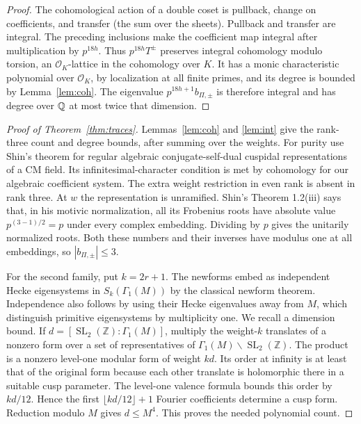 \documentclass[a4paper,11pt]{article}
\theoremstyle{definition}
\theoremstyle{remark}
\newcommand{\ZZ}{\mathbb Z}\newcommand{\ord}{\operatorname{ord}}
\numberwithin{equation}{section}
\newcommand{\OO}{\mathcal O}
\begin{document}
\begin{proof}
The cohomological action of a double coset is pullback, change on coefficients, and transfer (the sum over the sheets). Pullback and transfer are integral. The preceding inclusions make the coefficient map integral after multiplication by \(p^{18h}\). Thus \(p^{18h}T^\pm\) preserves integral cohomology modulo torsion, an \(\OO_K\)-lattice in the cohomology over \(K\). It has a monic characteristic polynomial over \(\OO_K\), by localization at all finite primes, and its degree is bounded by Lemma~\ref{lem:coh}. The eigenvalue \(p^{18h+1}b_{\Pi,\pm}\) is therefore integral and has degree over \(\mathbb Q\) at most twice that dimension.
\end{proof}

\begin{proof}[Proof of Theorem~\ref{thm:traces}]
Lemmas~\ref{lem:coh} and \ref{lem:int} give the rank-three count and degree bounds, after summing over the weights. For purity use Shin's theorem for regular algebraic conjugate-self-dual cuspidal representations of a CM field. Its infinitesimal-character condition is met by cohomology for our algebraic coefficient system. The extra weight restriction in even rank is absent in rank three. At \(w\) the representation is unramified. Shin's Theorem 1.2(iii) says that, in his motivic normalization, all its Frobenius roots have absolute value \(p^{(3-1)/2}=p\) under every complex embedding. Dividing by \(p\) gives the unitarily normalized roots. Both these numbers and their inverses have modulus one at all embeddings, so \(|b_{\Pi,\pm}|\le3\).~\cite[Thm.~1.2]{VI-IV-V-shin}

For the second family, put \(k=2r+1\). The newforms embed as independent Hecke eigensystems in \(S_k(\Gamma_1(M))\) by the classical newform theorem. Independence also follows by using their Hecke eigenvalues away from \(M\), which distinguish primitive eigensystems by multiplicity one. We recall a dimension bound. If \(d=[\operatorname{SL}_2(\ZZ):\Gamma_1(M)]\), multiply the weight-\(k\) translates of a nonzero form over a set of representatives of \(\Gamma_1(M)\backslash\operatorname{SL}_2(\ZZ)\). The product is a nonzero level-one modular form of weight \(kd\). Its order at infinity is at least that of the original form because each other translate is holomorphic there in a suitable cusp parameter. The level-one valence formula bounds this order by \(kd/12\). Hence the first \(\lfloor kd/12\rfloor+1\) Fourier coefficients determine a cusp form. Reduction modulo \(M\) gives \(d\le M^4\). This proves the needed polynomial count.


\end{proof}
\end{document}
